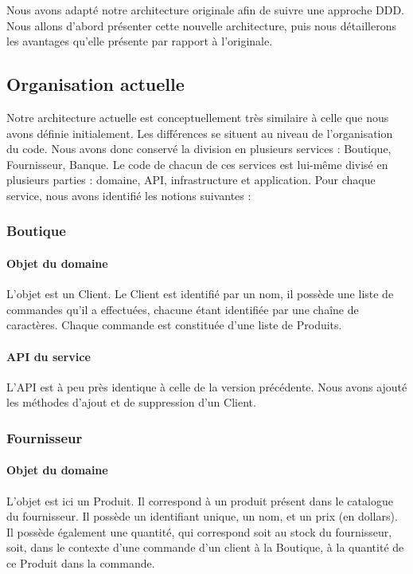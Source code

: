 \documentclass[a4paper,12pt]{article}
\begin{document}
Nous avons adapté notre architecture originale afin de suivre une approche DDD.
Nous allons d'abord présenter cette nouvelle architecture, puis nous détaillerons les avantages qu'elle présente par rapport à l'originale.

\subsection{Organisation actuelle}

Notre architecture actuelle est conceptuellement très similaire à celle que nous avons définie initialement.
Les différences se situent au niveau de l'organisation du code.
Nous avons donc conservé la division en plusieurs services : Boutique, Fournisseur, Banque.
Le code de chacun de ces services est lui-même divisé en plusieurs parties : domaine, API, infrastructure et application.
Pour chaque service, nous avons identifié les notions suivantes :

\subsubsection{Boutique}
\paragraph{Objet du domaine}
L'objet est un Client. Le Client est identifié par un nom, il possède une liste de commandes qu'il a effectuées, chacune étant identifiée par une chaîne de caractères. Chaque commande est constituée d'une liste de Produits.
\paragraph{API du service}
L'API est à peu près identique à celle de la version précédente. Nous avons ajouté les méthodes d'ajout et de suppression d'un Client.

\subsubsection{Fournisseur}
\paragraph{Objet du domaine}
L'objet est ici un Produit. Il correspond à un produit présent dans le catalogue du fournisseur. Il possède un identifiant unique, un nom, et un prix (en dollars). Il possède également une quantité, qui correspond soit au stock du fournisseur, soit, dans le contexte d'une commande d'un client à la Boutique, à la quantité de ce Produit dans la commande.
\end{document}
